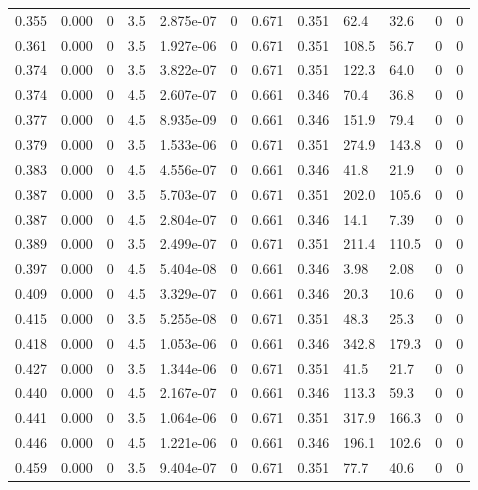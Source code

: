 \documentclass[preview]{standalone}
\begin{document}
{{{\begin{tabular}{L{1.2cm}C{1.2cm} C{0.3cm}C{0.5cm} C{1.4cm}C{1.4cm} C{1.4cm}C{1.4cm} C{1.6cm}C{1.6cm} C{1.6cm}C{1.6cm}}
  0.355  &  0.000  & 0     & 3.5 &  2.875e-07  & 0  &  0.671&   0.351& 62.4 & 32.6   &  0 & 0  \\ 
  0.361  &  0.000  & 0     & 3.5 &  1.927e-06  & 0  &  0.671&   0.351& 108.5 & 56.7   &  0 & 0  \\ 
  0.374  &  0.000  & 0     & 3.5 &  3.822e-07  & 0  &  0.671&   0.351& 122.3 & 64.0   &  0 & 0  \\ 
  0.374  &  0.000  & 0     & 4.5 &  2.607e-07  & 0  &  0.661&   0.346& 70.4 & 36.8   &  0 & 0  \\ 
  0.377  &  0.000  & 0     & 4.5 &  8.935e-09  & 0  &  0.661&   0.346& 151.9 & 79.4   &  0 & 0  \\ 
  0.379  &  0.000  & 0     & 3.5 &  1.533e-06  & 0  &  0.671&   0.351& 274.9 & 143.8   &  0 & 0  \\ 
  0.383  &  0.000  & 0     & 4.5 &  4.556e-07  & 0  &  0.661&   0.346& 41.8 & 21.9   &  0 & 0  \\ 
  0.387  &  0.000  & 0     & 3.5 &  5.703e-07  & 0  &  0.671&   0.351& 202.0 & 105.6   &  0 & 0  \\ 
  0.387  &  0.000  & 0     & 4.5 &  2.804e-07  & 0  &  0.661&   0.346& 14.1 & 7.39   &  0 & 0  \\ 
  0.389  &  0.000  & 0     & 3.5 &  2.499e-07  & 0  &  0.671&   0.351& 211.4 & 110.5   &  0 & 0  \\ 
  0.397  &  0.000  & 0     & 4.5 &  5.404e-08  & 0  &  0.661&   0.346& 3.98 & 2.08   &  0 & 0  \\ 
  0.409  &  0.000  & 0     & 4.5 &  3.329e-07  & 0  &  0.661&   0.346& 20.3 & 10.6   &  0 & 0  \\ 
  0.415  &  0.000  & 0     & 3.5 &  5.255e-08  & 0  &  0.671&   0.351& 48.3 & 25.3   &  0 & 0  \\ 
  0.418  &  0.000  & 0     & 4.5 &  1.053e-06  & 0  &  0.661&   0.346& 342.8 & 179.3   &  0 & 0  \\ 
  0.427  &  0.000  & 0     & 3.5 &  1.344e-06  & 0  &  0.671&   0.351& 41.5 & 21.7   &  0 & 0  \\ 
  0.440  &  0.000  & 0     & 4.5 &  2.167e-07  & 0  &  0.661&   0.346& 113.3 & 59.3   &  0 & 0  \\ 
  0.441  &  0.000  & 0     & 3.5 &  1.064e-06  & 0  &  0.671&   0.351& 317.9 & 166.3   &  0 & 0  \\ 
  0.446  &  0.000  & 0     & 4.5 &  1.221e-06  & 0  &  0.661&   0.346& 196.1 & 102.6   &  0 & 0  \\ 
  0.459  &  0.000  & 0     & 3.5 &  9.404e-07  & 0  &  0.671&   0.351& 77.7 & 40.6   &  0 & 0  \\ 

\end{tabular}}}}
\end{document}
